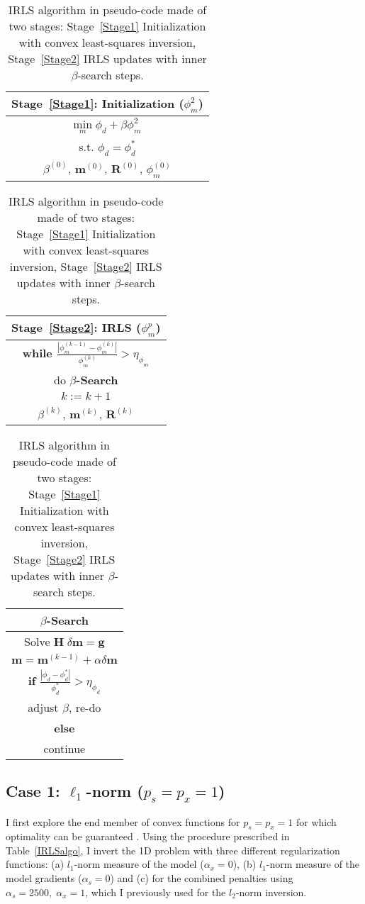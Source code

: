 \begin{table}\centering
\def\arraystretch{1.25}
\begin{tabular}{|c|}\hline
\bf{Stage~\ref{Stage1}}: Initialization ($\phi_m^2$)	\\ \hline
$\underset{m}{\text{min}}\; \phi_d + \beta \phi_m^2$\\
s.t. $\phi_d = \phi_d^*$ \\
$\beta^{(0)}$, $\mathbf{m}^{(0)}$, $\mathbf{R}^{(0)}$, $\phi_m^{(0)}$\\\hline
\end{tabular}
\begin{tabular}{|c|}\hline
\bf{Stage~\ref{Stage2}}: IRLS ($\phi_m^p$)	\\ \hline
\bf{while} \; $\frac{|\phi_m^{(k-1)}-\phi_m^{(k)}|}{\phi_m^{(k)}} > \eta_{\phi_m}$ \\
do \textbf{$\beta$-Search} \\
$k := k+1$\\
$\beta^{(k)}$, $\mathbf{m}^{(k)}$, $\mathbf{R}^{(k)}$\\\hline
\end{tabular}
\begin{tabular}{|c|}\hline
\textbf{$\beta$-Search} \\ \hline
Solve $\mathbf{H}\; \delta \mathbf{m} = \mathbf{g}$ \\
$\mathbf{m} = \mathbf{m}^{(k-1)} + \alpha \delta \mathbf{m}$ \\
\textbf{if} $\frac{|\phi_d - \phi_d^*|}{\phi_d^*} > \eta_{\phi_d} $ \\
adjust $\beta$, re-do\\
\textbf{else} \\
continue \\ \hline
\end{tabular}
\caption{IRLS algorithm in pseudo-code made of two stages: Stage~\ref{Stage1} Initialization with convex least-squares inversion, Stage~\ref{Stage2} IRLS updates with inner $\beta$-search steps.}
\label{IRLSalgo}
\end{table}

\subsection{Case 1: $\ell_1$-norm ($p_s=p_x=1$)}\label{l1norm}
I first explore the end member of convex functions for $p_s = p_x = 1$ for which optimality can be guaranteed \cite[]{Osborne1985, Daubechies10}.
Using the procedure prescribed in Table~\eqref{IRLSalgo}, I invert the 1D problem with three different regularization functions: (a) $l_1$-norm measure of the model ($\alpha_x = 0$), (b) $l_1$-norm measure of the model gradients ($\alpha_s = 0$) and (c) for the combined penalties using $\alpha_s=2500,\;\alpha_x = 1$, which I previously used for the $l_2$-norm inversion.

